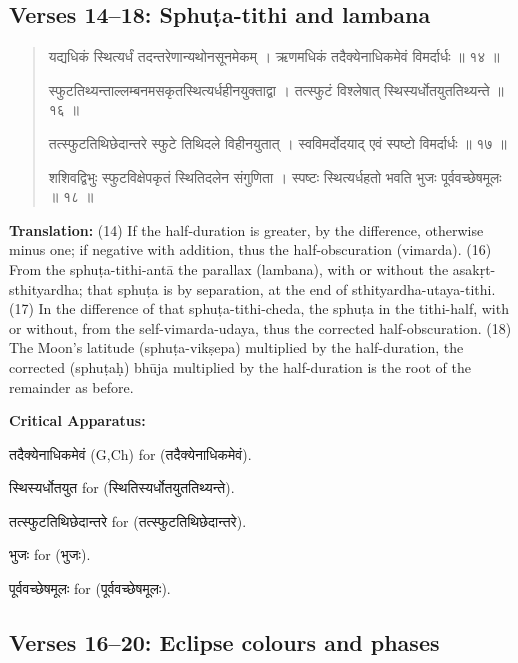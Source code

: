 \documentclass[11pt,a4paper]{article}
\newcommand{\dev}[1]{{\devanagarifont #1}}
\newenvironment{sanskritverse}{%
  \begin{quote}%
  \devanagarifont%
  \setlength{\leftmargin}{2em}%
}{\end{quote}}
\newenvironment{variants}{%
  \small%
  \color{varecolor}%
  \list{}{\leftmargin=2em\itemindent=-1em}%
}{\endlist}
\begin{document}
\subsection*{Verses 14--18: Sphuṭa-tithi and lambana}

\begin{sanskritverse}
\dev{यद्यधिकं स्थित्यर्धं तदन्तरेणान्यथोनसूनमेकम्} ।
\dev{ऋणमधिकं तदैक्येनाधिकमेवं विमर्दार्धः ॥ १४ ॥}

\dev{स्फुटतिथ्यन्ताल्लम्बनमसकृतस्थित्यर्धहीनयुक्ताद्वा} ।
\dev{तत्स्फुटं विश्लेषात् स्थिस्यर्धोतयुततिथ्यन्ते ॥ १६ ॥}

\dev{तत्स्फुटतिथिछेदान्तरे स्फुटे तिथिदले विहीनयुतात्} ।
\dev{स्वविमर्दोदयाद् एवं स्पष्टो विमर्दार्धः ॥ १७ ॥}

\dev{शशिवद्विभुः स्फुटविक्षेपकृतं स्थितिदलेन संगुणिता} ।
\dev{स्पष्टः स्थित्यर्धहतो भवति भुजः पूर्ववच्छेषमूलः ॥ १८ ॥}
\end{sanskritverse}

\textbf{Translation:} (14) If the half-duration is greater, by the difference, 
otherwise minus one; if negative with addition, thus the half-obscuration (vimarda). 
(16) From the sphuṭa-tithi-antā the parallax (lambana), with or without the 
asakṛt-sthityardha; that sphuṭa is by separation, at the end of sthityardha-utaya-tithi. 
(17) In the difference of that sphuṭa-tithi-cheda, the sphuṭa in the tithi-half, 
with or without, from the self-vimarda-udaya, thus the corrected half-obscuration. 
(18) The Moon's latitude (sphuṭa-vikṣepa) multiplied by the half-duration, the 
corrected (sphuṭaḥ) bhūja multiplied by the half-duration is the root of the 
remainder as before.

\textcolor{varecolor}{\textbf{Critical Apparatus:}}
\begin{variants}
\item[14.1] \dev{तदैक्येनाधिकमेवं} (G,Ch) \dev{for} (\dev{तदैक्येनाधिकमेवं}).
\item[16.1] \dev{स्थिस्यर्धोतयुत} \dev{for} (\dev{स्थितिस्यर्धोतयुततिथ्यन्ते}).
\item[17.1] \dev{तत्स्फुटतिथिछेदान्तरे} \dev{for} (\dev{तत्स्फुटतिथिछेदान्तरे}).
\item[18.1] \dev{भुजः} \dev{for} (\dev{भुजः}).
\item[18.2] \dev{पूर्ववच्छेषमूलः} \dev{for} (\dev{पूर्ववच्छेषमूलः}).
\end{variants}

\subsection*{Verses 16--20: Eclipse colours and phases}
\end{document}
